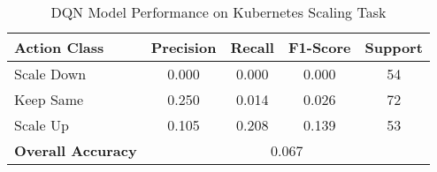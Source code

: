 
\begin{table}[htbp]
\centering
\caption{DQN Model Performance on Kubernetes Scaling Task}
\label{tab:dqn_performance}
\begin{tabular}{lcccc}
\hline
\textbf{Action Class} & \textbf{Precision} & \textbf{Recall} & \textbf{F1-Score} & \textbf{Support} \\
\hline
Scale Down & 0.000 & 0.000 & 0.000 & 54 \\
Keep Same & 0.250 & 0.014 & 0.026 & 72 \\
Scale Up & 0.105 & 0.208 & 0.139 & 53 \\
\hline
\textbf{Overall Accuracy} & \multicolumn{4}{c}{0.067} \\
\hline
\end{tabular}
\end{table}
